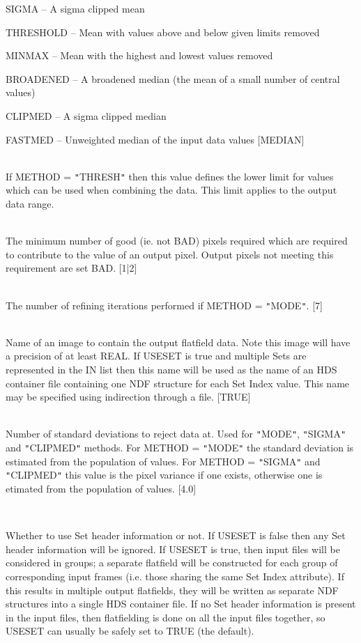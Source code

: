 \documentclass[twoside,11pt]{article}
\renewcommand{\_}{\texttt{\symbol{95}}}
\newcommand{\qt}[1]{{\tt "}#1{\tt "}}
\newcommand{\sstsubsection}[1]{ \item[{#1}] \mbox{} \\}
\newcommand{\sstitem}{\item}
\newcommand{\sstsubsection}[1]{\item[{#1}]}
\newcommand{\sstitem}{\item}
\begin{document}
{{{{            \sstitem
               SIGMA     -- A sigma clipped mean

            \sstitem
               THRESHOLD -- Mean with values above and below given
                               limits removed

            \sstitem
               MINMAX    -- Mean with the highest and lowest values
                               removed

            \sstitem
               BROADENED -- A broadened median (the mean of a small
                               number of central values)
            \sstitem
               CLIPMED   -- A sigma clipped median

            \sstitem
               FASTMED   -- Unweighted median of the input data values
            [MEDIAN]
         }
      }
      \sstsubsection{
         MIN = \_REAL (Read)
      } {
         If METHOD = \qt{THRESH} then this value defines the lower limit
         for values which can be used when combining the data. This
         limit applies to the output data range.
      }
      \sstsubsection{
         MINPIX = \_INTEGER (Read)
      } {
         The minimum number of good (ie. not BAD) pixels required which
         are required to contribute to the value of an output pixel.
         Output pixels not meeting this requirement are set BAD.
         [1|2]
      }
      \sstsubsection{
         NITER = \_INTEGER (Read)
      } {
         The number of refining iterations performed if METHOD = \qt{MODE}.
         [7]
      }
      \sstsubsection{
         OUT = LITERAL (Write)
      } {
         Name of an image to contain the output flatfield data. Note this
         image will have a precision of at least \_REAL. 
         If USESET is true and multiple Sets are represented in the IN
         list then this name will be used as the name of an HDS 
         container file containing one NDF structure for each Set Index value.
         This name may be specified using indirection through a file.
         [TRUE]
      }
      \sstsubsection{
         SIGMAS = \_REAL (Read)
      } {
         Number of standard deviations to reject data at. Used for
         \qt{MODE}, \qt{SIGMA} and \qt{CLIPMED} methods. For METHOD =
         \qt{MODE} the standard deviation is estimated from the
         population of values. For METHOD = \qt{SIGMA} and
         \qt{CLIPMED} this value is the pixel variance if one exists,
         otherwise one is etimated from the population of values.
         [4.0]
      }
      \sstsubsection{
         USESET = \_LOGICAL (Read)
      } {
         Whether to use Set header information or not.  If USESET is
         false then any Set header information will be ignored.
         If USESET is true, then input files will be considered in
         groups; a separate flatfield will be constructed for each
         group of corresponding input frames (i.e. those sharing 
         the same Set Index attribute).  If this results in multiple
         output flatfields, they will be written as separate NDF structures into
         a single HDS container file.  If no Set header information 
         is present in the input files, then flatfielding is done  
         on all the input files together, so USESET can usually be 
         safely set to TRUE (the default).

}}}
\end{document}
